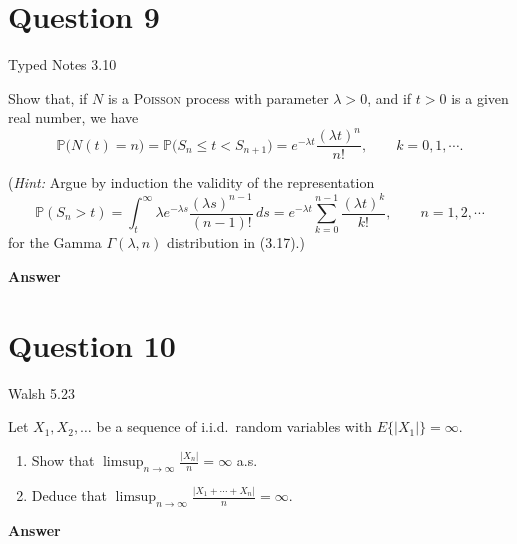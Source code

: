 \documentclass[letterpaper]{article}
\begin{document}
		\section{Question 9}
		
			{\color{deepred} Typed Notes 3.10} 
			
			Show that, if $N$ is a \textsc{Poisson} process with parameter $\lambda>0$, and if $t>0$ is a given real number, we have
		\[
		\mathbb{P}\bigl(N(t)=n\bigr)=\mathbb{P}\bigl(S_n\le t<S_{n+1}\bigr)
		= e^{-\lambda t}\frac{(\lambda t)^n}{n!},\qquad k=0,1,\cdots .
		\]
		
		(\textit{Hint:} Argue by induction the validity of the representation
		\[
		\mathbb{P}(S_n>t)=\int_t^\infty \lambda e^{-\lambda s}\frac{(\lambda s)^{n-1}}{(n-1)!}\,ds
		= e^{-\lambda t}\sum_{k=0}^{n-1}\frac{(\lambda t)^k}{k!},\qquad n=1,2,\cdots
		\]
		for the Gamma $\Gamma(\lambda,n)$ distribution in (3.17).)
		
		\textbf{Answer}
		
		\clearpage
		
		\section{Question 10}
		
		{\color{deepred} Walsh 5.23} 
		
		Let $X_1, X_2, \ldots$ be a sequence of i.i.d.\ random variables with $E\{|X_1|\}=\infty$.
		\begin{enumerate}
			\item[(a)] Show that $\displaystyle \limsup_{n\to\infty}\frac{|X_n|}{n}=\infty$ a.s.
			\item[(b)] Deduce that $\displaystyle \limsup_{n\to\infty}\frac{|X_1+\cdots+X_n|}{n}=\infty$.
		\end{enumerate}
		
		\textbf{Answer}
		
		\clearpage
		
	
\end{document}
